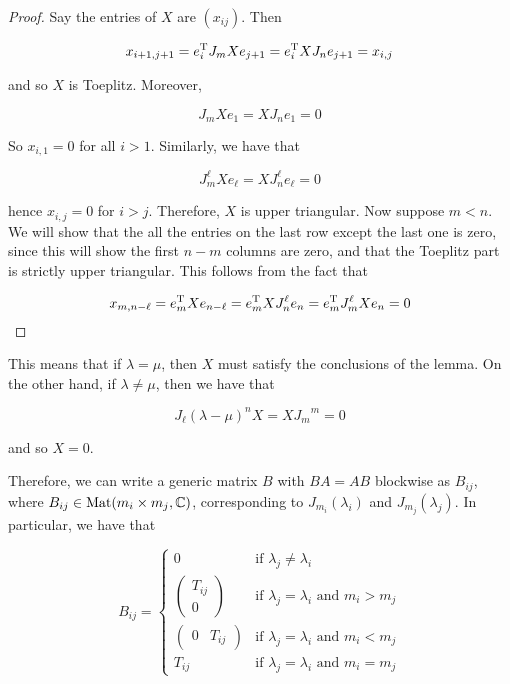 \documentclass{article}
\begin{document}
\begin{proof}
    Say the entries of \(X\) are \((x_{ij})\). Then

    \[x_{i+1, j+1} = e_i^{\mathrm{T}} J_m Xe_{j+1} = e_i^{\mathrm{T}} X J_n e_{j+1} = x_{i, j}\]

    and so \(X\) is Toeplitz. Moreover,

    \[J_m X e_1 = X J_n e_1 = 0\]

    So \(x_{i, 1} = 0\) for all \(i > 1\). Similarly, we have that

    \[J_m^\ell X e_\ell = X J_n^\ell e_\ell = 0\]

    hence \(x_{i, j} = 0\) for \(i > j\). Therefore, \(X\) is upper triangular. Now suppose \(m < n\). We will show that the all the entries on the last row except the last one is zero, since this will show the first \(n - m\) columns are zero, and that the Toeplitz part is strictly upper triangular. This follows from the fact that

    \[x_{m, n-\ell} = e_m^{\mathrm{T}} X e_{n-\ell} =  e_m^{\mathrm{T}} X J_n^\ell e_n = e_m^{\mathrm{T}} J_m^\ell X e_n = 0\]
\end{proof}

This means that if \(\lambda = \mu\), then \(X\) must satisfy the conclusions of the lemma. On the other hand, if \(\lambda \ne \mu\), then we have that

\[J_\ell(\lambda - \mu)^n X = X{J_m}^m = 0\]

and so \(X = 0\).

Therefore, we can write a generic matrix \(B\) with \(BA = AB\) blockwise as \(B_{ij}\), where \(B_{ij} \in \operatorname{Mat}(m_i \times m_j, \mathbb{C})\), corresponding to \(J_{m_i}(\lambda_i)\) and \(J_{m_j}(\lambda_j)\). In particular, we have that

\[B_{ij} = \begin{cases}
    0 & \text{if }\lambda_j \ne \lambda_i \\
    \begin{pmatrix}
        T_{ij} \\ 0
    \end{pmatrix} & \text{if } \lambda_j = \lambda_i \text{ and } m_i > m_j \\
    \begin{pmatrix}
        0 & T_{ij}
    \end{pmatrix} & \text{if } \lambda_j = \lambda_i \text{ and } m_i < m_j \\
    T_{ij} & \text{if } \lambda_j = \lambda_i \text{ and } m_i = m_j
\end{cases}\]
\end{document}
